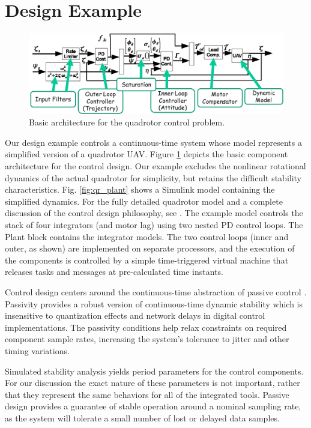 \section{Design Example}

\begin{figure}[tb]
\centering
\includegraphics[width=0.85\columnwidth]{figures/quadrotor_arch.png}
    \caption{Basic architecture for the quadrotor control problem.}
    \label{fig:quadrotor}
\end{figure}

Our design example controls a continuous-time system whose model represents a simplified 
version of a quadrotor UAV.  Figure \ref{fig:quadrotor} depicts the basic
component architecture for the control design.  Our example excludes the
nonlinear rotational dynamics of the actual quadrotor for simplicity, but
retains the difficult stability characteristics. Fig. \ref{fig:qr_plant} shows
a Simulink model containing the simplified dynamics. For the fully detailed
quadrotor model and a complete discussion of the control design philosophy, see
\cite{quad:passcontrol}. The example model controls the stack of four
integrators (and motor lag) using two nested PD control loops.
The Plant block contains the
integrator models. The two control loops (inner and outer, as shown) are
implemented on separate processors, and the execution of the components is
controlled by a simple time-triggered virtual machine that releases tasks and
messages at pre-calculated time instants.

Control design centers around the continuous-time abstraction of passive control \cite{quad:passcontrol}.  
Passivity provides a robust version of continuous-time dynamic stability which is insensitive to 
quantization effects \cite{pass:fettweis86} and network delays \cite{ncs:chopra}\cite{ncs:wireless} 
in digital control implementations.  The passivity conditions help relax constraints on required 
component sample rates, increasing the system's tolerance to jitter and other timing variations. 

Simulated stability analysis yields period parameters for the control components. For 
our discussion the exact nature of these parameters is not important, rather that they represent 
the same behaviors for all of the integrated tools.  Passive design provides a guarantee of stable 
operation around a nominal sampling rate, as the system will tolerate a small number of lost or 
delayed data samples.


